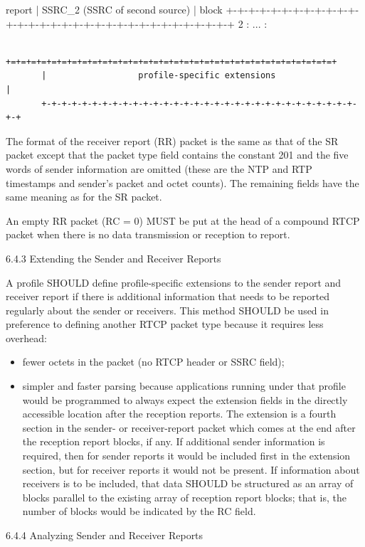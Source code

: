 \documentclass{article}
\begin{document}
report |                 SSRC\_2 (SSRC of second source)                | block  +-+-+-+-+-+-+-+-+-+-+-+-+-+-+-+-+-+-+-+-+-+-+-+-+-+-+-+-+-+-+-+-+ 2    :                               ...                             :

\begin{verbatim}
       +=+=+=+=+=+=+=+=+=+=+=+=+=+=+=+=+=+=+=+=+=+=+=+=+=+=+=+=+=+=+=+=+
       |                  profile-specific extensions                  |
       +-+-+-+-+-+-+-+-+-+-+-+-+-+-+-+-+-+-+-+-+-+-+-+-+-+-+-+-+-+-+-+-+
\end{verbatim}

The format of the receiver report (RR) packet is the same as that of the SR packet except that the packet type field contains the constant 201 and the five words of sender information are omitted (these are the NTP and RTP timestamps and sender's packet and octet counts). The remaining fields have the same meaning as for the SR packet.

An empty RR packet (RC = 0) MUST be put at the head of a compound RTCP packet when there is no data transmission or reception to report.

6.4.3 Extending the Sender and Receiver Reports

A profile SHOULD define profile-specific extensions to the sender report and receiver report if there is additional information that needs to be reported regularly about the sender or receivers.  This method SHOULD be used in preference to defining another RTCP packet type because it requires less overhead:

\begin{itemize}
\item fewer octets in the packet (no RTCP header or SSRC field);
\item simpler and faster parsing because applications running under that profile would be programmed to always expect the extension fields in the directly accessible location after the reception reports.
The extension is a fourth section in the sender- or receiver-report packet which comes at the end after the reception report blocks, if any.  If additional sender information is required, then for sender reports it would be included first in the extension section, but for receiver reports it would not be present.  If information about receivers is to be included, that data SHOULD be structured as an array of blocks parallel to the existing array of reception report blocks; that is, the number of blocks would be indicated by the RC field.

\end{itemize}
6.4.4 Analyzing Sender and Receiver Reports
\end{document}

